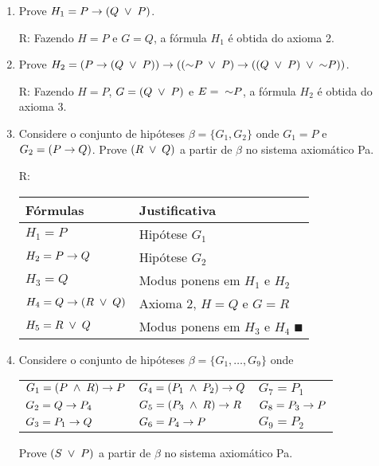   \clearpage
  \EXERCICIOS
  \begin{enumerate}
    \item Prove $H_1 = P \rightarrow (Q \;\lor\; P)$.
    
       R: Fazendo $H = P$ e $G = Q$, a fórmula $H_1$ é obtida do axioma 2.

    \item Prove $H_2 = ( P \rightarrow (Q \;\lor\; P) ) \rightarrow (  (\mathord{\sim} P \;\lor\; P) \rightarrow ( (Q \;\lor\; P) \;\lor\; \mathord{\sim} P)  )$.
    
      R: Fazendo $H = P$, $G = (Q \;\lor\; P)$ e $E = \; \mathord{\sim} P$, a fórmula $H_2$ é obtida do axioma 3.

    \item Considere o conjunto de hipóteses $\beta = \{ G_1, G_2 \}$ onde $G_1 = P$ e $G_2 = (P \rightarrow Q)$. Prove $(R \;\lor\; Q)$ a partir de $\beta$ no sistema axiomático Pa.
    
    R: 

\begin{tabular}{p{}p{}}
  \hline
    Fórmulas & Justificativa \\
  \hline
    $H_1 = P$                & Hipótese $G_1$ \\
    $H_2 = P \rightarrow Q$         & Hipótese $G_2$ \\
    $H_3 = Q$                & Modus ponens em $H_1$ e $H_2$ \\
    $H_4 = Q \rightarrow (R \;\lor\; Q)$ & Axioma 2, $H = Q$ e $G = R$ \\
    $H_5 = R \;\lor\; Q$          & Modus ponens em $H_3$ e $H_4$ $\QED$\\
  \hline
\end{tabular}

\item Considere o conjunto de hipóteses $\beta = \{ G_1, \dots, G_9 \}$ onde

\begin{tabular}{p{}p{}p{}}
    $G_1 = (P \;\land\; R) \rightarrow P$  & $G_4 = (P_1 \;\land\; P_2) \rightarrow Q$  & $G_7 = P_1$          \\
    $G_2 = Q \rightarrow P_4$         & $G_5 = (P_3 \;\land\; R  ) \rightarrow R$  & $G_8 = P_3 \rightarrow P$   \\
    $G_3 = P_1 \rightarrow Q$         & $G_6 = P_4 \rightarrow P$             & $G_9 = P_2$         \\
\end{tabular}

    Prove $(S \;\lor\; P)$ a partir de $\beta$ no sistema axiomático Pa.
    

\end{enumerate}
